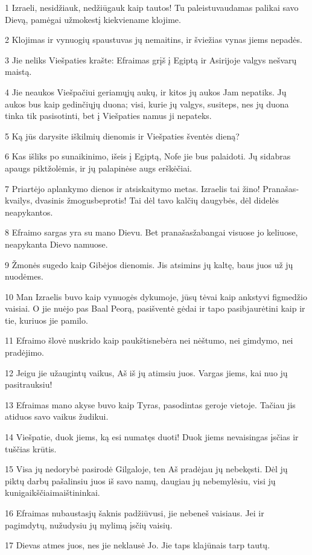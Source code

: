 \par 1 Izraeli, nesidžiauk, nedžiūgauk kaip tautos! Tu paleistuvaudamas palikai savo Dievą, pamėgai užmokestį kiekviename klojime. 
\par 2 Klojimas ir vynuogių spaustuvas jų nemaitins, ir šviežias vynas jiems nepadės. 
\par 3 Jie neliks Viešpaties krašte: Efraimas grįš į Egiptą ir Asirijoje valgys nešvarų maistą. 
\par 4 Jie neaukos Viešpačiui geriamųjų aukų, ir kitos jų aukos Jam nepatiks. Jų aukos bus kaip gedinčiųjų duona; visi, kurie jų valgys, susiteps, nes jų duona tinka tik pasisotinti, bet į Viešpaties namus ji nepateks. 
\par 5 Ką jūs darysite iškilmių dienomis ir Viešpaties šventės dieną? 
\par 6 Kas išliks po sunaikinimo, išeis į Egiptą, Nofe jie bus palaidoti. Jų sidabras apaugs piktžolėmis, ir jų palapinėse augs erškėčiai. 
\par 7 Priartėjo aplankymo dienos ir atsiskaitymo metas. Izraelis tai žino! Pranašas­kvailys, dvasinis žmogus­beprotis! Tai dėl tavo kalčių daugybės, dėl didelės neapykantos. 
\par 8 Efraimo sargas yra su mano Dievu. Bet pranašas­žabangai visuose jo keliuose, neapykanta Dievo namuose. 
\par 9 Žmonės sugedo kaip Gibėjos dienomis. Jis atsimins jų kaltę, baus juos už jų nuodėmes. 
\par 10 Man Izraelis buvo kaip vynuogės dykumoje, jūsų tėvai kaip ankstyvi figmedžio vaisiai. O jie nuėjo pas Baal Peorą, pasišventė gėdai ir tapo pasibjaurėtini kaip ir tie, kuriuos jie pamilo. 
\par 11 Efraimo šlovė nuskrido kaip paukštis­nebėra nei nėštumo, nei gimdymo, nei pradėjimo. 
\par 12 Jeigu jie užaugintų vaikus, Aš iš jų atimsiu juos. Vargas jiems, kai nuo jų pasitrauksiu! 
\par 13 Efraimas mano akyse buvo kaip Tyras, pasodintas geroje vietoje. Tačiau jis atiduos savo vaikus žudikui. 
\par 14 Viešpatie, duok jiems, ką esi numatęs duoti! Duok jiems nevaisingas įsčias ir tuščias krūtis. 
\par 15 Visa jų nedorybė pasirodė Gilgaloje, ten Aš pradėjau jų nebekęsti. Dėl jų piktų darbų pašalinsiu juos iš savo namų, daugiau jų nebemylėsiu, visi jų kunigaikščiai­maištininkai. 
\par 16 Efraimas nubaustas­jų šaknis padžiūvusi, jie nebeneš vaisiaus. Jei ir pagimdytų, nužudysiu jų mylimą įsčių vaisių. 
\par 17 Dievas atmes juos, nes jie neklausė Jo. Jie taps klajūnais tarp tautų.



